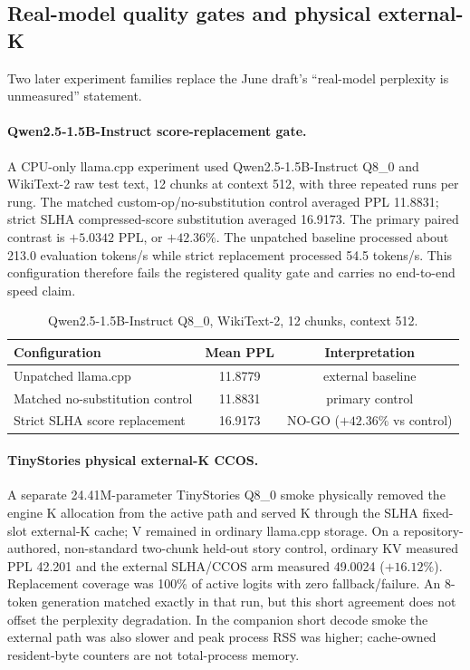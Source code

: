 \documentclass[11pt]{article}
\newcommand{\added}[1]{\textcolor{revisionblue}{#1}}
\newenvironment{addedblock}{\begingroup\color{revisionblue}}{\endgroup}
\theoremstyle{plain}
\theoremstyle{definition}
\begin{document}
\subsection{Real-model quality gates and physical external-K}
\label{sec:realmodel}
\begin{addedblock}
Two later experiment families replace the June draft's ``real-model
perplexity is unmeasured'' statement.

\paragraph{Qwen2.5-1.5B-Instruct score-replacement gate.}
A CPU-only llama.cpp experiment used Qwen2.5-1.5B-Instruct Q8\_0 and WikiText-2
raw test text, 12 chunks at context 512, with three repeated runs per rung.
The matched custom-op/no-substitution control averaged PPL 11.8831; strict SLHA
compressed-score substitution averaged 16.9173. The primary paired contrast is
$+5.0342$ PPL, or $+42.36\%$. The unpatched baseline processed about
213.0 evaluation tokens/s while strict replacement processed 54.5 tokens/s.
This configuration therefore fails the registered quality gate and carries no
end-to-end speed claim.

\begin{table}[t]
\centering
\caption{\added{Qwen2.5-1.5B-Instruct Q8\_0, WikiText-2, 12 chunks, context 512.}}
\label{tab:qwen-ppl}
\small
\begin{tabular}{@{}lcc@{}}
\toprule
Configuration & Mean PPL & Interpretation \\
\midrule
Unpatched llama.cpp & 11.8779 & external baseline \\
Matched no-substitution control & 11.8831 & primary control \\
Strict SLHA score replacement & 16.9173 & NO-GO ($+42.36\%$ vs control) \\
\bottomrule
\end{tabular}
\end{table}

\paragraph{TinyStories physical external-K CCOS.}
A separate 24.41M-parameter TinyStories Q8\_0 smoke physically removed the
engine K allocation from the active path and served K through the SLHA fixed-slot
external-K cache; V remained in ordinary llama.cpp storage. On a
repository-authored, non-standard two-chunk held-out story control, ordinary KV
measured PPL 42.201 and the external SLHA/CCOS arm measured 49.0024
($+16.12\%$). Replacement coverage was 100\% of active logits with zero
fallback/failure. An 8-token generation matched exactly in that run, but this
short agreement does not offset the perplexity degradation. In the companion
short decode smoke the external path was also slower and peak process RSS was
higher; cache-owned resident-byte counters are not total-process memory.
\end{addedblock}
\end{document}
